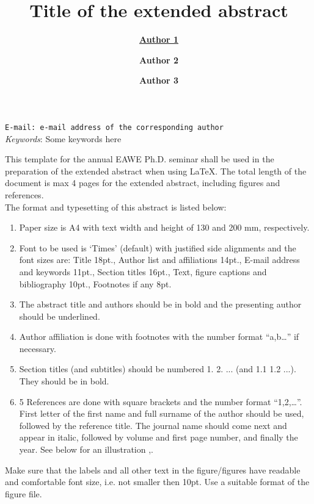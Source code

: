 \documentclass[a4paper, 10pt]{article}
\title{\textbf{Title of the extended abstract}}
\date{}
\author[a,b]{\underline {\textbf{Author 1}}}
\author[a]{\textbf{Author 2}}
\author[b]{\textbf{Author 3}}
\affil[a]{Affiliation a }
\affil[b]{Affiliation b }
\begin{document}
\maketitle
\thispagestyle{fancy}
\begin{center}
\vspace{-3em}
\texttt{E-mail: e-mail address of the corresponding author}\\
\medskip
\textit{Keywords}: Some keywords here
\end{center}
\medskip


This template for the annual EAWE Ph.D. seminar shall be used in the preparation of the extended abstract when using \LaTeX. The total length of the document is max 4 pages for the extended abstract, including figures and references.\\

The format and typesetting of this abstract is listed below: 
\renewcommand{\labelenumi}{\arabic{enumi}}
\renewcommand\labelitemi{\textendash}
\begin{enumerate}
\item Paper size is A4 with text width and height of 130 and 200 mm, respectively.
\item Font to be used is ‘Times’ (default) with justified side alignments and the font sizes are: Title 18pt., Author list and affiliations 14pt., E-mail address and keywords 11pt., Section titles 16pt., Text, figure captions and bibliography 10pt., Footnotes if any 8pt.
\item The abstract title and authors should be in bold and the presenting author should be underlined.
\item Author affiliation is done with footnotes with the number format “a,b…” if necessary.
\item Section titles (and subtitles) should be numbered 1.  2.  ... (and 1.1  1.2  ...). They should be in bold.
\item 5	References are done with square brackets and the number format “1,2,…”. First letter of the first name and full surname of the author should be used, followed by the reference title. The journal name should come next and appear in italic, followed by volume and first page number, and finally the year. See below for an illustration \cite{BLOCKEN201469},\cite{MO201311}.
\end{enumerate}

Make sure that the labels and all other text in the figure/figures have readable and comfortable font size, i.e. not smaller then 10pt. Use a suitable format of the figure file. 
\end{document}
